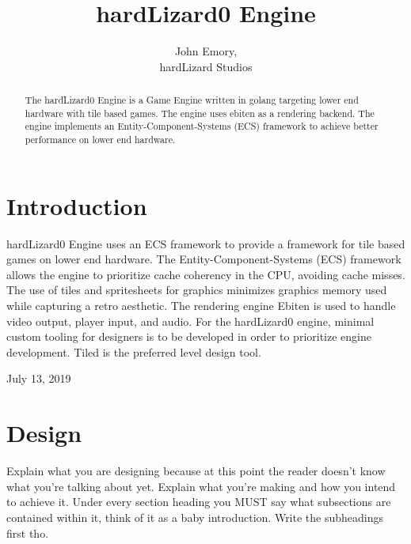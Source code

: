 \documentclass[journal]{IEEEtran}
\begin{document}
%
\title{hardLizard0 Engine}
\author{John Emory,\\hardLizard Studios}
\maketitle

\begin{abstract}
The hardLizard0 Engine is a Game Engine written in golang targeting lower end hardware with tile based games.
The engine uses ebiten as a rendering backend.
The engine implements an Entity-Component-Systems (ECS) framework to achieve better performance on lower end hardware.
\end{abstract}




\section{Introduction}

 hardLizard0 Engine uses an ECS framework to provide a framework for tile based games on lower end hardware.
The Entity-Component-Systems (ECS) framework allows the engine to prioritize cache coherency in the CPU, avoiding cache misses. 
The use of tiles and spritesheets for graphics minimizes graphics memory used while capturing a retro aesthetic.
The rendering engine Ebiten is used to handle video output, player input, and audio.
For the hardLizard0 engine, minimal custom tooling for designers is to be developed in order to prioritize engine development. 
Tiled is the preferred level design tool.

\hfill July 13, 2019

\section{Design}
Explain what you are designing because at this point the reader doesn't know what you're talking about yet. Explain what you're making and how you intend to achieve it. Under every section heading you MUST say what subsections are contained within it, think of it as a baby introduction. Write the subheadings first tho.
\end{document}
